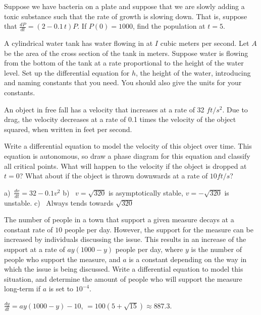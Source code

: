 \begin{exercise}\ansMark%
Suppose we have bacteria on a plate and suppose that we are slowly adding
a toxic substance such that the rate of growth is slowing down.  That is,
suppose that $\frac{dP}{dt} = (2-0.1\,t)P$.  If $P(0) = 1000$, find
the population at $t=5$.
\end{exercise}

\begin{exercise}\ansMark%
A cylindrical water tank has water flowing in at $I$ cubic meters
per second.
Let $A$ be the area of the cross section of the tank in meters.
Suppose water is
flowing from the bottom of the tank at a rate proportional to the height of
the water level.  Set up the differential equation for $h$, the height of the
water, introducing and naming
constants that you need.  You should also give the units for your constants.
\end{exercise}

\begin{exercise}
An object in free fall has a velocity that increases at a rate of 32 $ft/s^2$. Due to drag, the velocity decreases at a rate of 0.1 times the velocity of the object squared, when written in feet per second. 
\begin{tasks}
\task Write a differential equation to model the velocity of this object over time.
\task This equation is autonomous, so draw a phase diagram for this equation and classify all critical points.
\task What will happen to the velocity if the object is dropped at $t=0$? What about if the object is thrown downwards at a rate of $10 ft/s$?
\end{tasks}
\end{exercise}
\comboSol{%
}
{%
a)~$\frac{dv}{dt} = 32-0.1v^2$ \quad b)~ $v = \sqrt{320}$ is asymptotically stable, $v = -\sqrt{320}$ is unstable. \quad c)~ Always tends towards $\sqrt{320}$
}

\begin{exercise}
The number of people in a town that support a given measure decays at a constant rate of $10$ people per day. However, the support for the measure can be increased by individuals discussing the issue. This results in an increase of the support at a rate of $ay(1000 - y)$ people per day, where $y$ is the number of people who support the measure, and $a$ is a constant depending on the way in which the issue is being discussed. Write a differential equation to model this situation, and determine the amount of people who will support the measure long-term if $a$ is set to $10^{-4}$.  
\end{exercise}
\comboSol{%
}
{%
$\frac{dy}{dt} = ay(1000-y) - 10$, $=100(5 + \sqrt{15}) \approx 887.3$.
}

